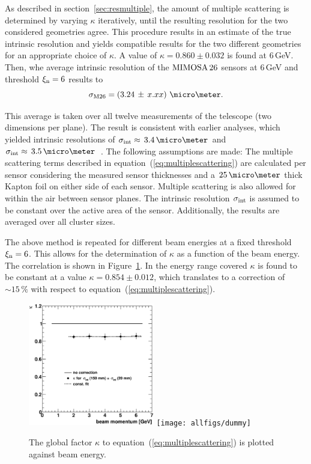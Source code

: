 As described in section~\ref{sec:resmultiple}, the amount of multiple scattering is determined by varying $\kappa$ iteratively, until the resulting resolution for the two considered geometries agree. 
This procedure results in an estimate of the true intrinsic resolution and yields compatible results for the two different geometries for an appropriate choice of $\kappa$. 
A value of $\kappa = 0.860 \pm 0.032$ is found at 6\,GeV. 
Then, whe average intrinsic resolution of the $\textrm{MIMOSA\,26}$ sensors at 6\,GeV and threshold $\xi_{\textrm{n}} = 6$ results to
\begin{equation}
 \sigma_{\textrm{M26}} = \left( 3.24\,\pm\, \allowbreak x.xx \right)\,\micro\meter.  
\end{equation}

\noindent
This average is taken over all twelve measurements of the telescope (two dimensions per plane). 
The result is consistent with earlier analyses, which yielded intrinsic resolutions of $\sigmai \approx\,3.4\,\micro\meter$ and $\sigmai \approx\,3.5\,\micro\meter$~\cite{ref:thomas,ref:mimosa26}.
The following assumptions are made: 
The multiple scattering terms described in equation~(\ref{eq:multiplescattering}) are calculated per sensor considering the measured sensor thicknesses
 and a $25\,\micro\meter$ thick Kapton foil on either side of each sensor.
Multiple scattering is also allowed for within the air between sensor planes. 
The intrinsic resolution $\sigma_{\textrm{int}}$ is assumed to be constant over the active area of the sensor. 
Additionally, the results are averaged over all cluster sizes. 

The above method is repeated for different beam energies at a fixed threshold $\xi_{\textrm{n}} = 6$. 
This allows for the determination of $\kappa$ as a function of the beam energy. 
The correlation is shown in Figure~\ref{fig:HL_factor}. 
In the energy range covered $\kappa$ is found to be constant at a value $\kappa = 0.854 \pm 0.012$, which translates to a correction of $\sim15\,\%$ with respect to equation~(\ref{eq:multiplescattering}).

\begin{figure}[b!]
  \centering
  \includegraphics[width=0.49\textwidth]{figures/kappa}
  \texttt{[image: allfigs/dummy]}
  \caption[HL Factor]{
  The global factor $\kappa$ to equation~(\ref{eq:multiplescattering}) is plotted against beam energy.
  }
  \label{fig:HL_factor}
\end{figure}

